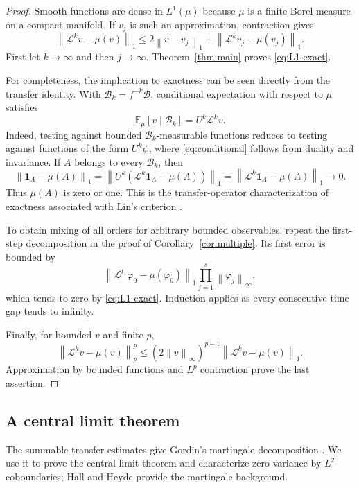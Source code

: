 \documentclass[11pt,reqno]{amsart}
\theoremstyle{plain}
\theoremstyle{definition}
\theoremstyle{remark}
\newcommand{\E}{\mathbb E}
\newcommand{\Lop}{\mathcal L}
\newcommand{\Bcal}{\mathcal B}
\newcommand{\norm}[1]{\left\lVert #1\right\rVert}
\numberwithin{equation}{section}
\begin{document}
\begin{proof}
Smooth functions are dense in $L^1(\mu)$ because $\mu$ is a finite Borel measure on a compact manifold. If $v_j$ is such an approximation, contraction gives
\[
 \norm{\Lop^kv-\mu(v)}_1
 \le2\norm{v-v_j}_1+\norm{\Lop^kv_j-\mu(v_j)}_1.
\]
First let $k\to\infty$ and then $j\to\infty$. Theorem~\ref{thm:main} proves \eqref{eq:L1-exact}.

For completeness, the implication to exactness can be seen directly from the transfer identity. With $\Bcal_k=f^{-k}\Bcal$, conditional expectation with respect to $\mu$ satisfies
\begin{equation}\label{eq:conditional}
 \E_\mu[v\mid\Bcal_k]=U^k\Lop^kv.
\end{equation}
Indeed, testing against bounded $\Bcal_k$-measurable functions reduces to testing against functions of the form $U^k\psi$, where \eqref{eq:conditional} follows from duality and invariance. If $A$ belongs to every $\Bcal_k$, then
\[
 \norm{\mathbf1_A-\mu(A)}_1
 =\norm{U^k(\Lop^k\mathbf1_A-\mu(A))}_1
 =\norm{\Lop^k\mathbf1_A-\mu(A)}_1\longrightarrow0.
\]
Thus $\mu(A)$ is zero or one. This is the transfer-operator characterization of exactness associated with Lin's criterion \cite{Lin71}.

To obtain mixing of all orders for arbitrary bounded observables, repeat the first-step decomposition in the proof of Corollary~\ref{cor:multiple}. Its first error is bounded by
\[
 \norm{\Lop^{t_1}\varphi_0-\mu(\varphi_0)}_1
 \prod_{j=1}^s\norm{\varphi_j}_\infty,
\]
which tends to zero by \eqref{eq:L1-exact}. Induction applies as every consecutive time gap tends to infinity.

Finally, for bounded $v$ and finite $p$,
\begin{equation}\label{eq:Lp-interpolation}
 \norm{\Lop^kv-\mu(v)}_p^p
 \le(2\norm{v}_\infty)^{p-1}
       \norm{\Lop^kv-\mu(v)}_1.
\end{equation}
Approximation by bounded functions and $L^p$ contraction prove the last assertion.
\end{proof}

\subsection{A central limit theorem}

The summable transfer estimates give Gordin's martingale decomposition \cite{Gordin69}. We use it to prove the central limit theorem and characterize zero variance by $L^2$ coboundaries; Hall and Heyde \cite{HallHeyde80} provide the martingale background.
\end{document}
